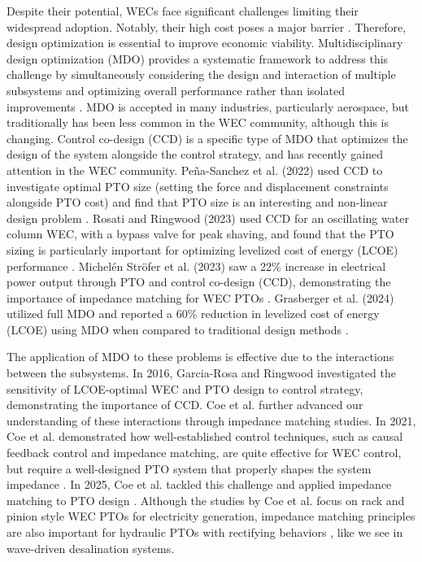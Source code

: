 \documentclass[a4paper,12pt]{elsarticle}
\begin{document}
Despite their potential, WECs face significant challenges limiting their widespread adoption. Notably, their high cost poses a major barrier \cite{Falcao2010}. Therefore, design optimization is essential to improve economic viability. Multidisciplinary design optimization (MDO) provides a systematic framework to address this challenge by simultaneously considering the design and interaction of multiple subsystems and optimizing overall performance rather than isolated improvements \cite{Sobieski}. MDO is accepted in many industries, particularly aerospace, but traditionally has been less common in the WEC community, although this is changing. Control co-design (CCD) is a specific type of MDO that optimizes the design of the system alongside the control strategy, and has recently gained attention in the WEC community. Peña-Sanchez et al. (2022) used CCD to investigate optimal PTO size (setting the  force and displacement constraints alongside PTO cost) and find that PTO size is an interesting and non-linear design problem \cite{PenaSanchez2022}. Rosati and Ringwood (2023) used CCD for an oscillating water column WEC, with a bypass valve for peak shaving, and found that the PTO sizing is particularly important for optimizing levelized cost of energy (LCOE) performance \cite{Rosati2023}. Michelén Ströfer et al. (2023) saw a 22\% increase in electrical power output through PTO and control co-design (CCD), demonstrating the importance of impedance matching for WEC PTOs \cite{Stroefer2023}. Grasberger et al. (2024) utilized full MDO and reported a 60\% reduction in levelized cost of energy (LCOE) using MDO when compared to traditional design methods \cite{Grasberger2024}. 

The application of MDO to these problems is effective due to the interactions between the subsystems. In 2016, Garcia-Rosa and Ringwood \cite{GarciaRosa2016} investigated the sensitivity of LCOE-optimal WEC and PTO design to control strategy, demonstrating the importance of CCD. Coe et al. further advanced our understanding of these interactions through impedance matching studies. In 2021, Coe et al. demonstrated how well-established control techniques, such as causal feedback control and impedance matching, are quite effective for WEC control, but require a well-designed PTO system that properly shapes the system impedance \cite{Coe2021}. In 2025, Coe et al. tackled this challenge and applied impedance matching to PTO design \cite{Coe2025}. Although the studies by Coe et al. focus on rack and pinion style WEC PTOs for electricity generation, impedance matching principles are also important for hydraulic PTOs with rectifying behaviors \cite{Ladan2015}, like we see in wave-driven desalination systems.
\end{document}
